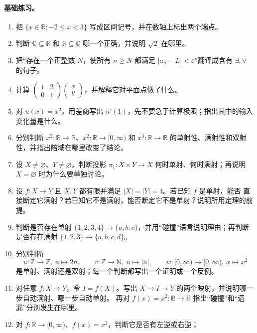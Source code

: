 \documentclass[UTF8,fontset=none,a4paper,11pt]{ctexart}
\theoremstyle{foundation-definition}
\theoremstyle{foundation-theorem}
\theoremstyle{foundation-proposition}
\theoremstyle{foundation-example}
\theoremstyle{foundation-remark}
\theoremstyle{foundation-theorem}
\begin{document}
\paragraph{基础练习。}
\begin{enumerate}[label=M0.\arabic*.]
  \item 把 \(\{x\in\mathbb R:-2\le x<3\}\) 写成区间记号，并在数轴上标出两个端点。
  \item 判断 \(\mathbb Q\subseteq\mathbb R\) 和 \(\mathbb R\subseteq\mathbb Q\) 哪一个正确，并说明 \(\sqrt2\) 在哪里。
  \item 把“存在一个正整数 \(N\)，使所有 \(n\ge N\) 都满足 \(|a_n-L|<\varepsilon\)”翻译成含有 \(\exists,\forall\) 的句子。
  \item 计算 \(\begin{pmatrix}1&2\\0&1\end{pmatrix}\begin{pmatrix}x\\y\end{pmatrix}\)，并解释它对平面点做了什么。
  \item 对 \(u(x)=x^2\)，用差商写出 \(u'(1)\)，先不要急于计算极限；指出其中的输入变化量是什么。
  \item 分别判断 \(x^2:\mathbb R\to\mathbb R\)、\(x^2:\mathbb R\to[0,\infty)\) 和
    \(x^3:\mathbb R\to\mathbb R\) 的单射性、满射性和双射性，并指出陪域在哪里改变了结论。
  \item 设 \(X\ne\varnothing\)、\(Y\ne\varnothing\)，判断投影
    \(\pi_1:X\times Y\to X\) 何时单射、何时满射；再说明 \(X=\varnothing\) 时为什么要单独讨论。
  \item 设 \(f:X\to Y\) 且 \(X,Y\) 都有限并满足 \(|X|=|Y|=4\)。若已知 \(f\) 是单射，能否
    直接断定它满射？若已知它不是满射，能否断定它不是单射？说明所用定理的前提。
  \item 判断是否存在单射 \(\{1,2,3,4\}\to\{a,b,c\}\)，并用“碰撞”语言说明理由；再判断
    是否存在满射 \(\{1,2,3\}\to\{a,b,c,d\}\)。
  \item 分别判断
    \[
    u:\mathbb Z\to\mathbb Z,\ n\mapsto 2n,\qquad
    v:\mathbb Z\to\mathbb N,\ n\mapsto |n|,\qquad
    w:[0,\infty)\to[0,\infty),\ x\mapsto x^2
    \]
    是单射、满射还是双射；每一个判断都写出一个证明或一个反例。
  \item 对任意 \(f:X\to Y\)，令 \(I=f(X)\)。写出
    \(X\to I\to Y\) 的两个映射，并说明哪一步自动满射、哪一步自动单射。
    再对 \(f(x)=x^2:\mathbb R\to\mathbb R\) 指出“碰撞”和“遗漏”分别发生在哪里。
  \item 对 \(f:\mathbb R\to[0,\infty)\)、\(f(x)=x^2\)，判断它是否有左逆或右逆；

\end{enumerate}
\end{document}
